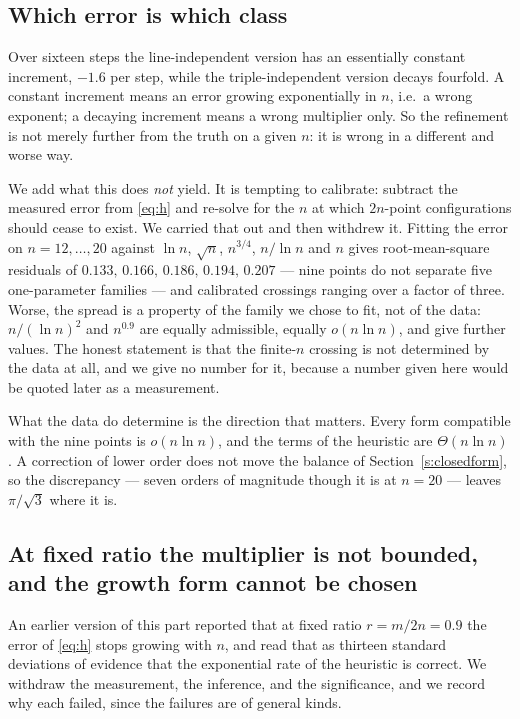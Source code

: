 \documentclass[11pt,a4paper]{article}
\begin{document}
\subsection{Which error is which class}\label{s:class}
Over sixteen steps the line-independent version has an essentially constant increment,
$-1.6$ per step, while the triple-independent version decays fourfold.  A constant increment means
an error growing exponentially in $n$, i.e.\ a wrong exponent; a decaying increment means a wrong
multiplier only.  So the refinement is not merely further from the truth on a given $n$: it is
wrong in a different and worse way.

We add what this does \emph{not} yield.  It is tempting to calibrate: subtract the measured error
from \eqref{eq:h} and re-solve for the $n$ at which $2n$-point configurations should cease to
exist.  We carried that out and then withdrew it.  Fitting the error on $n=12,\dots,20$ against
$\ln n$, $\sqrt n$, $n^{3/4}$, $n/\ln n$ and $n$ gives root-mean-square residuals of
$0.133,\,0.166,\,0.186,\,0.194,\,0.207$ --- nine points do not separate five one-parameter
families --- and calibrated crossings ranging over a factor of three.  Worse, the spread is a
property of the family we chose to fit, not of the data: $n/(\ln n)^2$ and $n^{0.9}$ are equally
admissible, equally $o(n\ln n)$, and give further values.  The honest statement is that the
finite-$n$ crossing is not determined by the data at all, and we give no number for it, because a
number given here would be quoted later as a measurement.

What the data do determine is the direction that matters.  Every form compatible with the nine
points is $o(n\ln n)$, and the terms of the heuristic are $\Theta(n\ln n)$.  A correction of lower
order does not move the balance of Section~\ref{s:closedform}, so the discrepancy --- seven orders of magnitude
though it is at $n=20$ --- leaves $\pi/\sqrt3$ where it is.

\subsection{At fixed ratio the multiplier is not bounded, and the growth form cannot be chosen}\label{s:ratio}
An earlier version of this part reported that at fixed ratio $r=m/2n=0.9$ the error of
\eqref{eq:h} stops growing with $n$, and read that as thirteen standard deviations of evidence
that the exponential rate of the heuristic is correct.  We withdraw the measurement, the
inference, and the significance, and we record why each failed, since the failures are of
general kinds.
\end{document}
